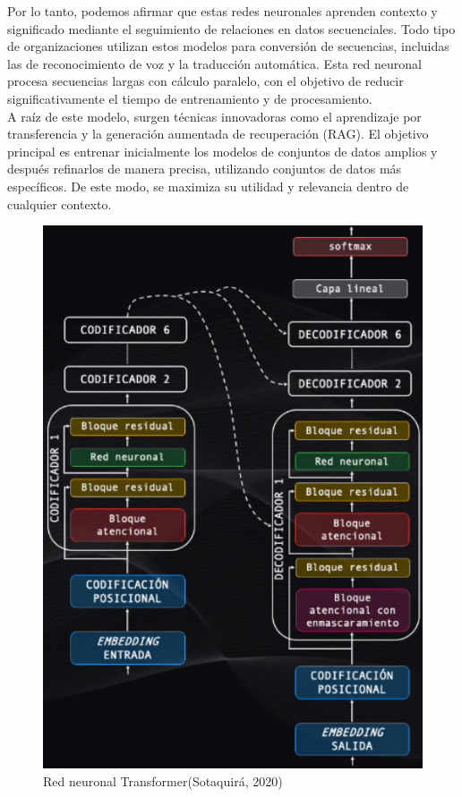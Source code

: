 \begin{itemize}
\end{itemize}


Por lo tanto, podemos afirmar que estas redes neuronales aprenden contexto y significado mediante el seguimiento de relaciones en datos secuenciales. Todo tipo de organizaciones utilizan estos modelos para conversión de secuencias, incluidas las de reconocimiento de voz y la traducción automática. Esta red neuronal procesa secuencias largas con cálculo paralelo, con el objetivo de reducir significativamente el tiempo de entrenamiento y de procesamiento.\\

A raíz de este modelo, surgen técnicas innovadoras como el aprendizaje por transferencia y la generación aumentada de recuperación (RAG). El objetivo principal es entrenar inicialmente los modelos de conjuntos de datos amplios y después refinarlos de manera precisa, utilizando conjuntos de datos más específicos. De este modo, se maximiza su utilidad y relevancia dentro de cualquier contexto.\\

\begin{figure}[h]
	\centering
	\includegraphics[width = 0.7 \textwidth]{Imagenes/Vectorial/transformer.png}
	\caption{Red neuronal Transformer(Sotaquirá, 2020)}
	\label{fig:transformer}
\end{figure}

